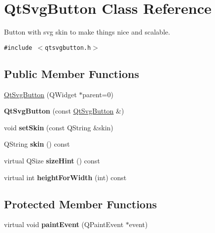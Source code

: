 \hypertarget{classQtSvgButton}{
\section{QtSvgButton Class Reference}
\label{classQtSvgButton}
}
Button with svg skin to make things nice and scalable.  


{\tt \#include $<$qtsvgbutton.h$>$}

\subsection*{Public Member Functions}
\begin{CompactItemize}
\item 
\hyperlink{classQtSvgButton_0d4ef1d4c1a5aaa69ac39590c0c4354b}{QtSvgButton} (QWidget $\ast$parent=0)
\item 
\hypertarget{classQtSvgButton_62277720c12b71e84209697d26cd1c23}{
\textbf{QtSvgButton} (const \hyperlink{classQtSvgButton}{QtSvgButton} \&)}
\label{classQtSvgButton_62277720c12b71e84209697d26cd1c23}

\item 
\hypertarget{classQtSvgButton_5c8f52c3df68b010670cdd6f2f55c39f}{
void \textbf{setSkin} (const QString \&skin)}
\label{classQtSvgButton_5c8f52c3df68b010670cdd6f2f55c39f}

\item 
\hypertarget{classQtSvgButton_da17eed3ab131681a0942573d71005df}{
QString \textbf{skin} () const }
\label{classQtSvgButton_da17eed3ab131681a0942573d71005df}

\item 
\hypertarget{classQtSvgButton_918a5cbf1fa074d4287d4dc10607e341}{
virtual QSize \textbf{sizeHint} () const }
\label{classQtSvgButton_918a5cbf1fa074d4287d4dc10607e341}

\item 
\hypertarget{classQtSvgButton_703b04ce6861b7cc3a68f105ce907f25}{
virtual int \textbf{heightForWidth} (int) const }
\label{classQtSvgButton_703b04ce6861b7cc3a68f105ce907f25}

\end{CompactItemize}
\subsection*{Protected Member Functions}
\begin{CompactItemize}
\item 
\hypertarget{classQtSvgButton_c06b3e2c58e733855478236f7d5fbb7c}{
virtual void \textbf{paintEvent} (QPaintEvent $\ast$event)}
\label{classQtSvgButton_c06b3e2c58e733855478236f7d5fbb7c}

\end{CompactItemize}
